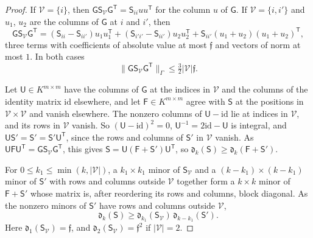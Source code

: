 \documentclass[11pt]{amsart}
\theoremstyle{definition}
\theoremstyle{remark}
\numberwithin{equation}{section}
\newcommand{\id}{\mathrm{id}}
\newcommand{\abs}[1]{\lvert #1\rvert}
\newcommand{\norm}[1]{\lVert #1\rVert}
\theoremstyle{plain}
\theoremstyle{definition}
\theoremstyle{plain}
\begin{document}
\begin{proof}
If $\mathcal V=\{i\}$, then $\mathsf G\mathsf S_{\mathcal V}\mathsf G^{\mathsf T}=\mathsf S_{ii}uu^{\mathsf T}$ for the column $u$ of $\mathsf G$. If $\mathcal V=\{i,i'\}$ and $u_1$, $u_2$ are the columns of $\mathsf G$ at $i$ and $i'$, then
\[
 \mathsf G\mathsf S_{\mathcal V}\mathsf G^{\mathsf T}=(\mathsf S_{ii}-\mathsf S_{ii'})u_1u_1^{\mathsf T}
 +(\mathsf S_{i'i'}-\mathsf S_{ii'})u_2u_2^{\mathsf T}+\mathsf S_{ii'}(u_1+u_2)(u_1+u_2)^{\mathsf T},
\]
three terms with coefficients of absolute value at most $\mathfrak f$ and vectors of norm at most $1$. In both cases
\begin{equation}\label{dp:eq:pivot-cost}
 \norm{\mathsf G\mathsf S_{\mathcal V}\mathsf G^{\mathsf T}}_\Gamma\le\tfrac32\abs{\mathcal V}\mathfrak f.
\end{equation}

Let $\mathsf U\in K^{m\times m}$ have the columns of $\mathsf G$ at the indices in $\mathcal V$ and the columns of the identity matrix $\id$ elsewhere, and let $\mathsf F\in K^{m\times m}$ agree with $\mathsf S$ at the positions in $\mathcal V\times\mathcal V$ and vanish elsewhere. The nonzero columns of $\mathsf U-\id$ lie at indices in $\mathcal V$, and its rows in $\mathcal V$ vanish. So $(\mathsf U-\id)^2=0$, $\mathsf U^{-1}=2\id-\mathsf U$ is integral, and $\mathsf U\mathsf S'=\mathsf S'=\mathsf S'\mathsf U^{\mathsf T}$, since the rows and columns of $\mathsf S'$ in $\mathcal V$ vanish. As $\mathsf U\mathsf F\mathsf U^{\mathsf T}=\mathsf G\mathsf S_{\mathcal V}\mathsf G^{\mathsf T}$, this gives $\mathsf S=\mathsf U(\mathsf F+\mathsf S')\mathsf U^{\mathsf T}$, so $\mathfrak d_k(\mathsf S)\ge\mathfrak d_k(\mathsf F+\mathsf S')$.

For $0\le k_1\le\min(k,\abs{\mathcal V})$, a $k_1\times k_1$ minor of $\mathsf S_{\mathcal V}$ and a $(k-k_1)\times(k-k_1)$ minor of $\mathsf S'$ with rows and columns outside $\mathcal V$ together form a $k\times k$ minor of $\mathsf F+\mathsf S'$ whose matrix is, after reordering its rows and columns, block diagonal. As the nonzero minors of $\mathsf S'$ have rows and columns outside $\mathcal V$,
\begin{equation}\label{dp:eq:minor-split}
 \mathfrak d_k(\mathsf S)\ge\mathfrak d_{k_1}(\mathsf S_{\mathcal V})\,\mathfrak d_{k-k_1}(\mathsf S').
\end{equation}
Here $\mathfrak d_1(\mathsf S_{\mathcal V})=\mathfrak f$, and $\mathfrak d_2(\mathsf S_{\mathcal V})=\mathfrak f^2$ if $\abs{\mathcal V}=2$.


\end{proof}
\end{document}
